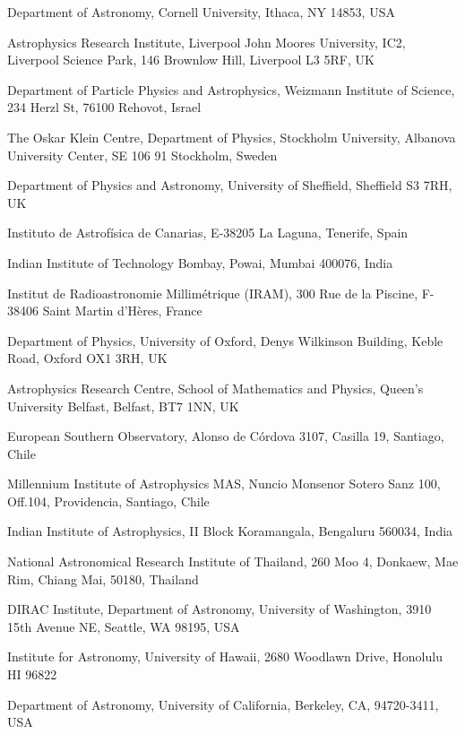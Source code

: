 \documentclass{nature_plusfigure}
\begin{document}
\begin{small}
\begin{affiliations}
\label{sec:affiliations}

\item Department of Astronomy, Cornell University, Ithaca, NY 14853, USA
\item Astrophysics Research Institute, Liverpool John Moores University, IC2, Liverpool Science Park, 146 Brownlow Hill, Liverpool L3 5RF, UK
\item Department of Particle Physics and Astrophysics, Weizmann Institute of Science, 234 Herzl St, 76100 Rehovot, Israel
\item The Oskar Klein Centre, Department of Physics, Stockholm University, Albanova University Center, SE 106 91 Stockholm, Sweden
\item Department of Physics and Astronomy, University of Sheffield, Sheffield S3 7RH, UK
\item Instituto de Astrofísica de Canarias, E-38205 La
Laguna, Tenerife, Spain
\item Indian Institute of Technology Bombay, Powai, Mumbai 400076, India
\item Institut de Radioastronomie Millimétrique (IRAM), 300 Rue de la Piscine, F-38406 Saint Martin d’Hères, France
\item Department of Physics, University of Oxford, Denys Wilkinson Building, Keble Road, Oxford OX1 3RH, UK
\item Astrophysics Research Centre, School of Mathematics and Physics, Queen’s University Belfast, Belfast, BT7 1NN, UK
\item European Southern Observatory, Alonso de C\'ordova 3107, Casilla 19, Santiago, Chile
\item Millennium Institute of Astrophysics MAS, Nuncio Monsenor Sotero Sanz 100, Off.104, Providencia, Santiago, Chile
\item Indian Institute of Astrophysics, II Block Koramangala, Bengaluru 560034, India
\item National Astronomical Research Institute of Thailand, 260 Moo 4, Donkaew, Mae Rim, Chiang Mai, 50180, Thailand
\item DIRAC Institute, Department of Astronomy, University of Washington, 3910 15th Avenue NE, Seattle, WA 98195, USA
\item Institute for Astronomy, University of Hawaii, 2680 Woodlawn Drive, Honolulu HI 96822
\item Department of Astronomy, University of California, Berkeley, CA, 94720-3411, USA 

\end{affiliations}
\end{small}
\end{document}
